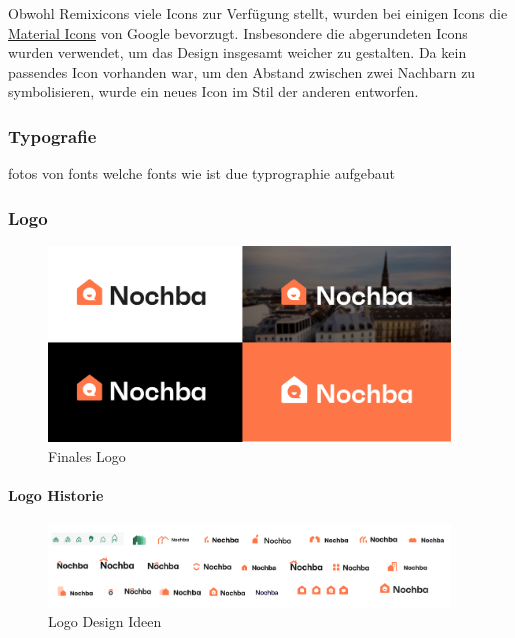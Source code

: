 Obwohl Remixicons viele Icons zur Verfügung stellt, wurden
bei einigen Icons die
\href{https://fonts.google.com/icons?icon.set=Material+Icons}{Material Icons}
von Google bevorzugt.
Insbesondere die abgerundeten Icons wurden verwendet, um das
Design insgesamt weicher zu gestalten. Da kein passendes
Icon vorhanden war, um den Abstand zwischen zwei Nachbarn zu
symbolisieren, wurde ein neues Icon im Stil der anderen
entworfen.

\subsubsection{Typografie}
fotos von fonts
welche fonts
wie ist due typrographie aufgebaut
\subsubsection{Logo}

\begin{figure}[ht]
  \centering
  \includegraphics[width=0.95\textwidth]{pics/final-logo.png}
  \caption{Finales Logo}
  \label{fig:final-logo}
\end{figure}


\paragraph{Logo Historie}

\begin{figure}[ht]
  \centering
  \includegraphics[width=0.95\textwidth]{pics/logo-historie.png}
  \caption{Logo Design Ideen}
  \label{fig:logo-historie}
\end{figure}

